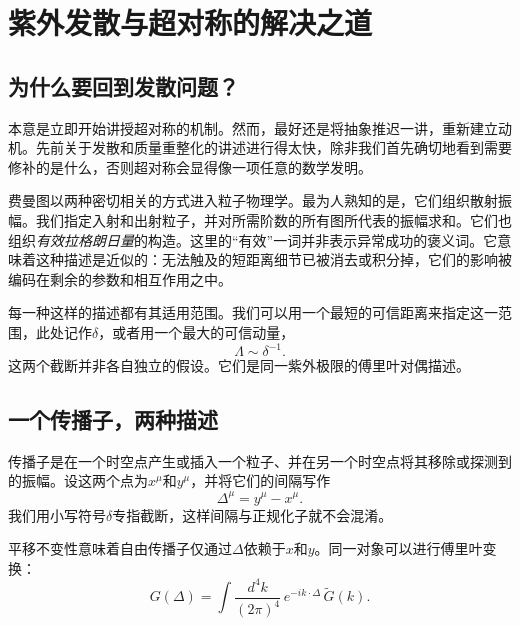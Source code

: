 \chapter{紫外发散与超对称的解决之道}


\section{为什么要回到发散问题？}

本意是立即开始讲授超对称的机制。然而，最好还是将抽象推迟一讲，重新建立动机。先前关于发散和质量重整化的讲述进行得太快，除非我们首先确切地看到需要修补的是什么，否则超对称会显得像一项任意的数学发明。

费曼图以两种密切相关的方式进入粒子物理学。最为人熟知的是，它们组织散射振幅。我们指定入射和出射粒子，并对所需阶数的所有图所代表的振幅求和。它们也组织\emph{有效拉格朗日量}的构造。这里的``有效''一词并非表示异常成功的褒义词。它意味着这种描述是近似的：无法触及的短距离细节已被消去或积分掉，它们的影响被编码在剩余的参数和相互作用之中。

每一种这样的描述都有其适用范围。我们可以用一个最短的可信距离来指定这一范围，此处记作\(\delta\)，或者用一个最大的可信动量，
\begin{equation}
\Lambda\sim \delta^{-1}.
\end{equation}
这两个截断并非各自独立的假设。它们是同一紫外极限的傅里叶对偶描述。

\section{一个传播子，两种描述}

传播子是在一个时空点产生或插入一个粒子、并在另一个时空点将其移除或探测到的振幅。设这两个点为\(x^\mu\)和\(y^\mu\)，并将它们的间隔写作
\begin{equation}
\Delta^\mu=y^\mu-x^\mu.
\end{equation}
我们用小写符号\(\delta\)专指截断，这样间隔与正规化子就不会混淆。

平移不变性意味着自由传播子仅通过\(\Delta\)依赖于\(x\)和\(y\)。同一对象可以进行傅里叶变换：
\begin{equation}
G(\Delta)
=\int\frac{d^4k}{(2\pi)^4}\,e^{-ik\cdot\Delta}\,\widetilde G(k).
\end{equation}

